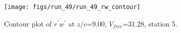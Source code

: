 \begin{figure}[H]
\centering
\texttt{[image: figs/run\_49/run\_49\_rw\_contour]}
\caption{Contour plot of $\overline{r^\prime w^\prime}$ at $z/c$=9.00, $V_{free}$=31.28, station 5.}
\end{figure}



